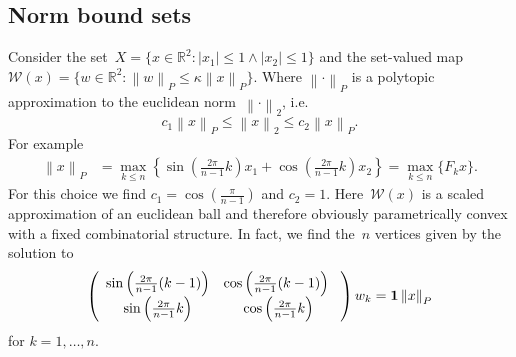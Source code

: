 \documentclass[a4paper, 12pt, twoside]{article}
\theoremstyle{definition}
\numberwithin{equation}{section}
\providecommand{\norm}[1]{\left\|#1\right\|}
\providecommand{\abs}[1]{\left|#1\right|}
\begin{document}
\subsection{Norm bound sets}\label{ssec:example:one}
%
Consider the set~$X = \{x\in\mathbb R^2: \abs{x_1}\leq 1\wedge \abs{x_2}\leq 1\}$ and the set-valued map $\mathcal W(x) = \{w\in\mathbb R^2: \norm{w}_P\leq\kappa\norm{x}_P\}$.
%
Where $\norm{\cdot}_P$ is a polytopic approximation to the euclidean norm~$\norm{\cdot}_2$, i.e.
%
$$
c_1 \norm{x}_P\leq\norm{x}_2\leq c_2\norm{x}_P.
$$
%
For example
%
$$\begin{aligned}
\norm{x}_P &= \max_{k\leq n}\left\{\sin\left(\frac{2\pi}{n-1}k\right) x_1 + \cos\left(\frac{2\pi}{n-1}k\right) x_2\right\} = \max_{k\leq n}\{F_k x\}.
\end{aligned}$$
%
For this choice we find $c_1 = \cos\left(\frac{\pi}{n-1}\right)$ and $c_2=1$.
%
Here~$\mathcal W(x)$ is a scaled approximation of an euclidean ball and therefore obviously parametrically convex with a fixed combinatorial structure.
%
In fact, we find the~$n$ vertices given by the solution to
%
$$
  \left(\begin{array}{cc}
  \sin\left(\frac{2\pi}{n-1}(k-1)\right) & \cos\left(\frac{2\pi}{n-1}(k-1)\right) \\
  \sin\left(\frac{2\pi}{n-1}k\right) & \cos\left(\frac{2\pi}{n-1}k\right)
  \end{array}
  \right) w_k = {\bf{1}}\norm{x}_P
$$
%
for $k=1,\dots,n$.
\end{document}
